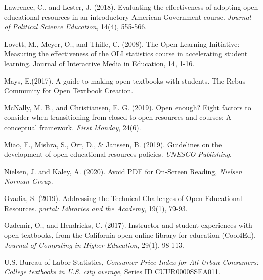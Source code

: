 \documentclass[11pt]{article}
\newcommand{\alink}[2]{\href{#1}{\textcolor{blue}{#2}}}
\begin{document}
\begin{thebibliography}{99}
   Lawrence, C., and Lester, J. (2018). Evaluating the effectiveness of adopting open educational resources in an introductory American Government course. {\em Journal of Political Science Education}, 14(4), 555-566.

   Lovett, M., Meyer, O., and Thille, C. (2008). The Open Learning Initiative: Measuring the effectiveness of the OLI statistics course in accelerating student learning. Journal of Interactive Media in Education, 14, 1-16.

   Mays, E.(2017). A guide to making open textbooks with students. The Rebus Community for Open Textbook Creation.

   McNally, M. B., and Christiansen, E. G. (2019). Open enough? Eight factors to consider when transitioning from closed to open resources and courses: A conceptual framework. {\em First Monday}, 24(6).%

   Miao, F., Mishra, S., Orr, D., \& Janssen, B. (2019). Guidelines on the development of open educational resources policies. {\em UNESCO Publishing}.%

   Nielsen, J. and Kaley, A. (2020).  Avoid PDF for On-Screen Reading, {\em Nielsen Norman Group}.%
  
   Ovadia, S. (2019). Addressing the Technical Challenges of Open Educational Resources.  {\em portal: Libraries and the Academy}, 19(1), 79-93.%

   Ozdemir, O., and Hendricks, C. (2017). Instructor and student experiences with open textbooks, from the California open online library for education (Cool4Ed). {\em Journal of Computing in Higher Education}, 29(1), 98-113.

   U.S. Bureau of Labor Statistics, {\em Consumer Price Index for All Urban Consumers: College textbooks in U.S. city average}, Series ID CUUR0000SSEA011.%


\end{thebibliography}
\end{document}

